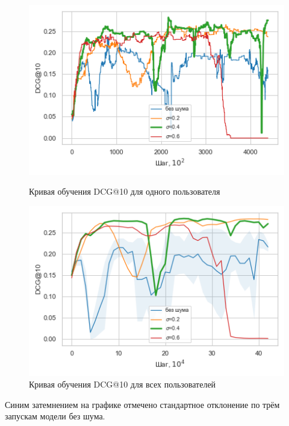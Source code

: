 \documentclass[14pt]{extarticle}
\begin{document}
\begin{figure}[H]
	\begin{minipage}[b]{0.49\textwidth}
		\centering
		\includegraphics[scale=0.55]{img/curve_dcg.png}
	\caption{Кривая обучения DCG@10 для одного пользователя}
	\label{fig:hit_curve}
	\end{minipage}
	\hfill
	\begin{minipage}[b]{0.49\textwidth}
		\centering
		\includegraphics[scale=0.55]{img/curve_dcg_all_.png}
	\caption{Кривая обучения DCG@10 для всех пользователей}
	\label{fig:hit_curve}
		
	\end{minipage}
\end{figure}

Синим затемнением на графике отмечено стандартное отклонение по трём запускам модели без шума.
\end{document}
